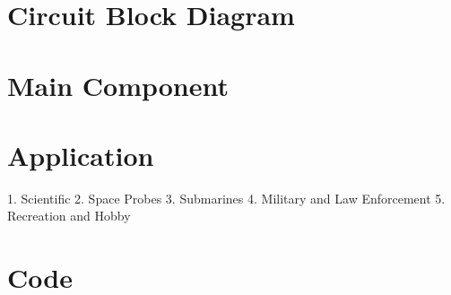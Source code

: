 \documentclass[sigconf]{acmart}
\begin{document}
\section{Circuit Block Diagram}

\section{Main Component}

\section{Application}
1. Scientific
2. Space Probes
3. Submarines
4. Military and Law Enforcement
5. Recreation and Hobby

\section{Code}
\end{document}
